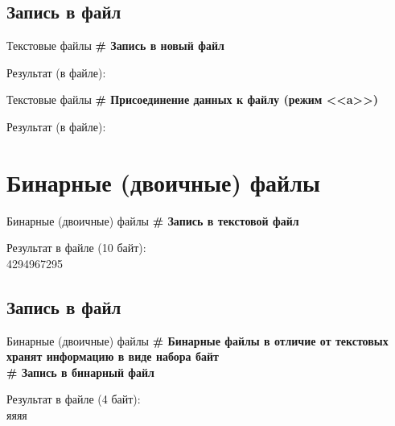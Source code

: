 \documentclass[12pt]{beamer}
\begin{document}
\subsection{Запись в файл}
\begin{frame}{Текстовые файлы}
\textbf{\# Запись в новый файл} \\
\vspace{0.5cm}

\vspace{0.5cm}
Результат (в файле): \\

\end{frame}


\begin{frame}{Текстовые файлы}
\textbf{\# Присоединение данных к файлу (режим <<a>>)} \\
\vspace{0.3cm}

\vspace{0.5cm}
Результат (в файле): \\

\end{frame}

\section{Бинарные (двоичные) файлы}
\begin{frame}{Бинарные (двоичные) файлы}
\textbf{\# Запись в текстовой файл} \\
\vspace{0.5cm}

\vspace{0.5cm}
Результат в файле (10 байт): \\
4294967295 \\
\end{frame}


\subsection{Запись в файл}
\begin{frame}{Бинарные (двоичные) файлы}
\textbf{\# Бинарные файлы в отличие от текстовых хранят информацию в виде набора байт} \\
\vspace{0.3cm}
\textbf{\# Запись в бинарный файл} \\
\vspace{0.5cm}

\vspace{0.5cm}
Результат в файле (4 байт): \\
яяяя \\
\end{frame}
\end{document}
